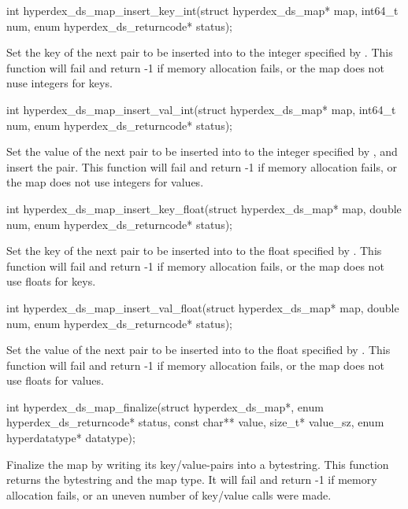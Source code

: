 \begin{ccode}
int hyperdex_ds_map_insert_key_int(struct hyperdex_ds_map* map,
                                   int64_t num,
                                   enum hyperdex_ds_returncode* status);
\end{ccode}
Set the key of the next pair to be inserted into  to the
integer specified by .  This function will fail and return -1 if
memory allocation fails, or the map does not nuse integers for keys.

\begin{ccode}
int hyperdex_ds_map_insert_val_int(struct hyperdex_ds_map* map,
                                   int64_t num,
                                   enum hyperdex_ds_returncode* status);
\end{ccode}
Set the value of the next pair to be inserted into  to the
integer specified by , and insert the pair.  This function will fail
and return -1 if memory allocation fails, or the map does not use integers for
values.

\begin{ccode}
int hyperdex_ds_map_insert_key_float(struct hyperdex_ds_map* map,
                                     double num,
                                     enum hyperdex_ds_returncode* status);
\end{ccode}
Set the key of the next pair to be inserted into  to the
float specified by .  This function will fail and return -1 if memory
allocation fails, or the map does not use floats for keys.

\begin{ccode}
int hyperdex_ds_map_insert_val_float(struct hyperdex_ds_map* map,
                                     double num,
                                     enum hyperdex_ds_returncode* status);
\end{ccode}
Set the value of the next pair to be inserted into  to the
float specified by .  This function will fail and return -1 if memory
allocation fails, or the map does not use floats for values.

\begin{ccode}
int hyperdex_ds_map_finalize(struct hyperdex_ds_map*,
                             enum hyperdex_ds_returncode* status,
                             const char** value, size_t* value_sz,
                             enum hyperdatatype* datatype);
\end{ccode}
Finalize the map by writing its key/value-pairs  into a bytestring.
This function returns the bytestring and the map type.  It will fail and return
-1 if memory allocation fails, or an uneven number of key/value calls were made.

